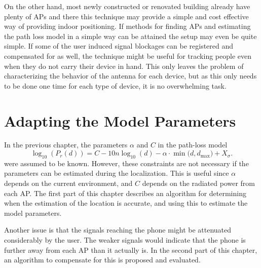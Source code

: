 \documentclass{LTHthesis}
\begin{document}
On the other hand, most newly constructed or renovated building already have plenty of APs and there this technique may provide a simple and cost effective way of providing indoor positioning. If methods for finding APs and estimating the path loss model in a simple way can be attained the setup may even be quite simple. If some of the user induced signal blockages can be registered and compensated for as well, the technique might be useful for tracking people even when they do not carry their device in hand. This only leaves the problem of characterizing the behavior of the antenna for each device, but as this only needs to be done one time for each type of device, it is no overwhelming task.        
%
\chapter{Adapting the Model Parameters} %
\label{chap:adapt}
%

In the previous chapter, the parameters $\alpha$ and $C$ in the path-loss model 
%
\begin{equation}
\log_{10}({P_r(d)})=C-10n\log_{10}(d) - \alpha\cdot\min({d, d_{\text{max}})}+ X_\sigma.
\label{equation:model_to_adapt}
\end{equation}
%
were assumed to be known. However, these constraints are not necessary if the parameters can be estimated during the localization. This is useful since $\alpha$ depends on the current environment, and $C$ depends on the radiated power from each AP. The first part of this chapter describes an algorithm for determining when the estimation of the location is accurate, and using this to estimate the model parameters. 

Another issue is that the signals reaching the phone might be attenuated considerably by the user. The weaker signals would indicate that the phone is further away from each AP than it actually is. In the second part of this chapter, an algorithm to compensate for this is proposed and evaluated.

%
\end{document}

